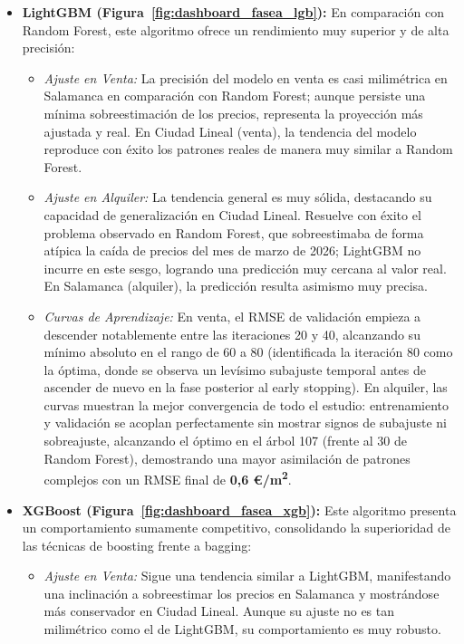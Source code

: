 \documentclass[a4paper,11pt,openany]{book}
\begin{document}
\begin{itemize}
\begin{enumerate}
    \end{enumerate}
    Por otro lado, en alquiler la validación se mantiene por encima del entrenamiento con una brecha mínima (entre \textbf{0,01 €/m\textsuperscript{2}} y \textbf{0,09 €/m\textsuperscript{2}}).
    \item \textbf{LightGBM (Figura~\ref{fig:dashboard_fasea_lgb}):} En comparación con Random Forest, este algoritmo ofrece un rendimiento muy superior y de alta precisión:
    \begin{itemize}
        \item \textit{Ajuste en Venta:} La precisión del modelo en venta es casi milimétrica en Salamanca en comparación con Random Forest; aunque persiste una mínima sobreestimación de los precios, representa la proyección más ajustada y real. En Ciudad Lineal (venta), la tendencia del modelo reproduce con éxito los patrones reales de manera muy similar a Random Forest.
        \item \textit{Ajuste en Alquiler:} La tendencia general es muy sólida, destacando su capacidad de generalización en Ciudad Lineal. Resuelve con éxito el problema observado en Random Forest, que sobreestimaba de forma atípica la caída de precios del mes de marzo de 2026; LightGBM no incurre en este sesgo, logrando una predicción muy cercana al valor real. En Salamanca (alquiler), la predicción resulta asimismo muy precisa.
        \item \textit{Curvas de Aprendizaje:} En venta, el RMSE de validación empieza a descender notablemente entre las iteraciones 20 y 40, alcanzando su mínimo absoluto en el rango de 60 a 80 (identificada la iteración 80 como la óptima, donde se observa un levísimo subajuste temporal antes de ascender de nuevo en la fase posterior al early stopping). En alquiler, las curvas muestran la mejor convergencia de todo el estudio: entrenamiento y validación se acoplan perfectamente sin mostrar signos de subajuste ni sobreajuste, alcanzando el óptimo en el árbol 107 (frente al 30 de Random Forest), demostrando una mayor asimilación de patrones complejos con un RMSE final de \textbf{0,6 €/m\textsuperscript{2}}.
    \end{itemize}
    \item \textbf{XGBoost (Figura~\ref{fig:dashboard_fasea_xgb}):} Este algoritmo presenta un comportamiento sumamente competitivo, consolidando la superioridad de las técnicas de boosting frente a bagging:
    \begin{itemize}
        \item \textit{Ajuste en Venta:} Sigue una tendencia similar a LightGBM, manifestando una inclinación a sobreestimar los precios en Salamanca y mostrándose más conservador en Ciudad Lineal. Aunque su ajuste no es tan milimétrico como el de LightGBM, su comportamiento es muy robusto.

\end{itemize}
\end{itemize}
\end{document}
